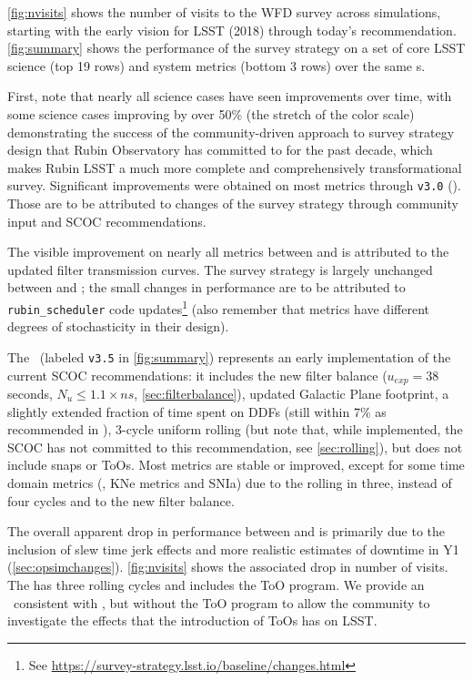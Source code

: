  \autoref{fig:nvisits} shows the number of visits to the WFD survey across simulations, starting with the early vision for LSST (2018) through today's recommendation. \autoref{fig:summary} shows the performance of the survey strategy on a set of core LSST science (top 19 rows) and system metrics (bottom 3 rows) over the same \opsim s. 
 
 First, note that nearly all science cases have seen improvements over time, with some science cases improving by over 50\% (the stretch of the color scale) demonstrating the success of the community-driven approach to survey strategy design that Rubin Observatory has committed to for the past decade, which makes Rubin LSST a much more complete and comprehensively transformational survey. Significant improvements were obtained on most metrics through \texttt{v3.0} (). Those are to be attributed to changes of the survey strategy through community input and SCOC recommendations. 
 
 The visible improvement on nearly all metrics between  and  is attributed to the updated filter transmission curves. The survey strategy is largely unchanged between  and ; the small changes in performance are to be attributed to  \texttt{rubin\_scheduler} code updates\footnote{See \url{https://survey-strategy.lsst.io/baseline/changes.html}} (also remember that metrics have different degrees of stochasticity in their design). 
 
 The  \opsim\ (labeled \texttt{v3.5} in \autoref{fig:summary}) represents an early implementation of the current SCOC recommendations: it includes the new filter balance ($u_{exp}=38$ seconds, $N_u \leq1.1\times ns$, \autoref{sec:filterbalance}), updated Galactic Plane footprint, a slightly extended fraction of time spent on DDFs (still within 7\% as recommended in ), 3-cycle uniform rolling (but note that, while implemented, the SCOC has not committed to this recommendation, see \autoref{sec:rolling}), but does not include snaps or ToOs. Most metrics are stable or improved, except for some time domain metrics (\eg, KNe metrics and SNIa) due to the rolling in three, instead of four cycles and to the new filter balance. 
 
 The overall apparent drop in performance between  and  is primarily due to the inclusion of slew time jerk effects and more realistic estimates of downtime in Y1 (\autoref{sec:opsimchanges}). \autoref{fig:nvisits} shows the associated drop in number of visits. The  has three rolling cycles and includes the ToO program. We provide an \opsim\ consistent with , but without the ToO program to allow the community to investigate the effects that the introduction of ToOs has on LSST. 
 
